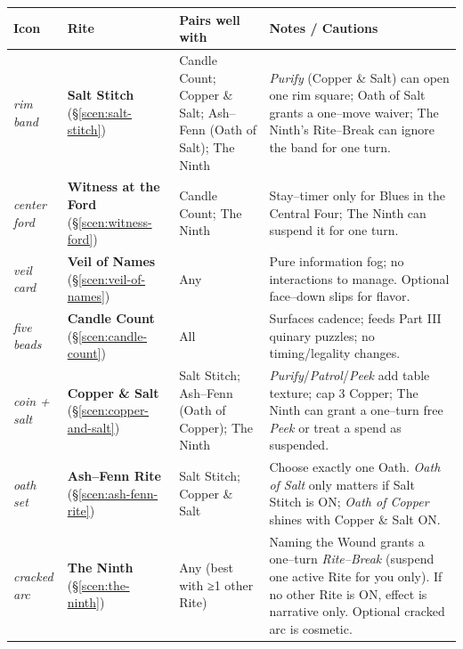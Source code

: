 \documentclass[11pt]{article}
\numberwithin{equation}{section} %
\theoremstyle{plain} %
\theoremstyle{definition} %
\theoremstyle{remark} %
\renewcommand{\arraystretch}{1.15}
\begin{document}
\medskip
\renewcommand{\arraystretch}{1.18}
\begin{tabular}{p{2.2cm} p{3.8cm} p{6.6cm} p{4.2cm}}
\toprule
\textbf{Icon} & \textbf{Rite} & \textbf{Pairs well with} & \textbf{Notes / Cautions}\\
\midrule
\textit{rim band} %
& \textbf{Salt Stitch} (\S\ref{scen:salt-stitch})
& Candle Count; Copper \& Salt; Ash–Fenn (Oath of Salt); The Ninth
& \emph{Purify} (Copper \& Salt) can open one rim square; Oath of Salt grants a one–move waiver; The Ninth’s Rite–Break can ignore the band for one turn.\\

\textit{center ford} %
& \textbf{Witness at the Ford} (\S\ref{scen:witness-ford})
& Candle Count; The Ninth
& Stay–timer only for Blues in the Central Four; The Ninth can suspend it for one turn.\\

\textit{veil card} %
& \textbf{Veil of Names} (\S\ref{scen:veil-of-names})
& Any
& Pure information fog; no interactions to manage. Optional face–down slips for flavor.\\

\textit{five beads} %
& \textbf{Candle Count} (\S\ref{scen:candle-count})
& All
& Surfaces cadence; feeds Part III quinary puzzles; no timing/legality changes.\\

\textit{coin + salt} %
& \textbf{Copper \& Salt} (\S\ref{scen:copper-and-salt})
& Salt Stitch; Ash–Fenn (Oath of Copper); The Ninth
& \emph{Purify}/\emph{Patrol}/\emph{Peek} add table texture; cap 3 Copper; The Ninth can grant a one–turn free \emph{Peek} or treat a spend as suspended.\\

\textit{oath set} %
& \textbf{Ash–Fenn Rite} (\S\ref{scen:ash-fenn-rite})
& Salt Stitch; Copper \& Salt
& Choose exactly one Oath. \emph{Oath of Salt} only matters if Salt Stitch is \textsc{ON}; \emph{Oath of Copper} shines with Copper \& Salt \textsc{ON}.\\

\textit{cracked arc} %
& \textbf{The Ninth} (\S\ref{scen:the-ninth})
& Any (best with ≥1 other Rite)
& Naming the Wound grants a one–turn \emph{Rite–Break} (suspend one active Rite for you only). If no other Rite is \textsc{ON}, effect is narrative only. Optional cracked arc is cosmetic.\\
\bottomrule
\end{tabular}
\end{document}
